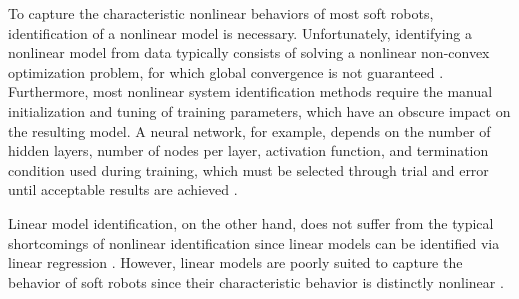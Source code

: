 To capture the characteristic nonlinear behaviors of most soft robots, identification of a nonlinear model is necessary.
Unfortunately, identifying a nonlinear model from data typically consists of solving a nonlinear non-convex optimization problem, for which global convergence is not guaranteed \cite{boyd2004convex}.
Furthermore, most nonlinear system identification methods require the manual initialization and tuning of training parameters, which have an obscure impact on the resulting model.
A neural network, for example, depends on the number of hidden layers, number of nodes per layer, activation function, and termination condition used during training, which must be selected through trial and error until acceptable results are achieved \cite{gillespie2018learning} .

Linear model identification, on the other hand, does not suffer from the typical shortcomings of nonlinear identification 
since linear models can be identified via linear regression \cite{ljung1987system}.
However, linear models are poorly suited to capture the behavior of soft robots since their characteristic behavior is distinctly nonlinear \cite{rus2015design} .



